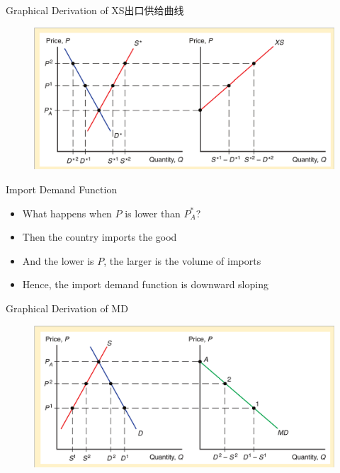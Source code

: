 \documentclass[10pt,hyperref={CJKbookmarks=true},xcolor=dvipsnames,aspectratio=169]{beamer}
\begin{document}
\begin{frame}{Graphical Derivation of XS出口供给曲线}


\begin{figure}


\includegraphics[scale=0.4]{fig/instruments/lec07-4}

\end{figure}

\end{frame}

\begin{frame}{Import Demand Function}

\begin{itemize}
\item What happens when $P$ is lower than $P_{A}^{*}$? 
\item Then the country imports the good 
\item And the lower is $P$, the larger is the volume of imports 
\item Hence, the import demand function is downward sloping
\end{itemize}
\end{frame}

\begin{frame}{Graphical Derivation of MD}


\begin{figure}


\includegraphics[scale=0.4]{fig/instruments/lec07-5}

\end{figure}

\end{frame}
\end{document}
